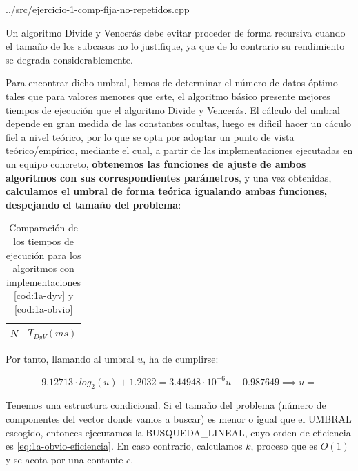 



{../src/ejercicio-1-comp-fija-no-repetidos.cpp} 


Un algoritmo Divide y Vencerás debe evitar proceder de forma recursiva cuando el tamaño de los subcasos no lo justifique, ya que
de lo contrario su rendimiento se degrada considerablemente. 

Para encontrar dicho umbral, hemos de determinar el número de datos óptimo tales que para valores menores que este, el algoritmo básico 
presente mejores tiempos de ejecución que el algoritmo Divide y Vencerás. El cálculo del umbral depende en gran medida de las constantes ocultas, 
luego es dificil hacer un cáculo fiel a nivel teórico, por lo que se opta por adoptar un punto de vista teórico/empírico, mediante el cual, a partir de las 
implementaciones ejecutadas en un equipo concreto, \textbf{obtenemos las funciones de ajuste de ambos algoritmos con sus correspondientes 
parámetros}, y una vez obtenidas, \textbf{calculamos el umbral de forma teórica igualando ambas funciones, despejando el tamaño del problema}: 

\begin{table}
	\footnotesize
	\centering
	\begin{tabular}{|r|r|}
		\hline
		$N$ & $T_{DyV}(ms)$ \\
		\hline
	\end{tabular}

	\caption{Comparación de los tiempos de ejecución para los algoritmos con implementaciones \ref{cod:1a-dyv} y \ref{cod:1a-obvio}}
	\label{tab:1a-com}
\end{table}

Por tanto, llamando al umbral $u$, ha de cumplirse: 

\begin{equation}
9.12713 \cdot log_{2}{(u)} + 1.2032 = 3.44948 \cdot 10^{-6} u + 0.987649
\implies \boxed{u = }
\label{eq:}
\end{equation}


Tenemos una estructura condicional. Si el tamaño del problema (número de componentes del vector donde 
vamos a buscar) es menor o igual que el UMBRAL escogido, entonces ejecutamos la BUSQUEDA\_LINEAL, cuyo orden de eficiencia es \ref{eq:1a-obvio-eficiencia}. 
En caso contrario, calculamos $k$, proceso que es $O(1)$ y se acota por una contante $c$. 

